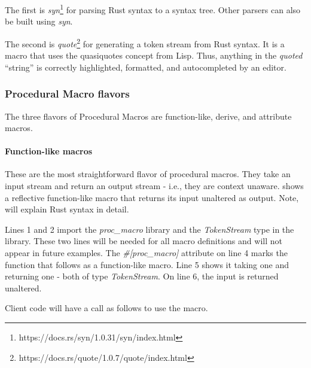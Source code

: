 The first is \textit{syn}\footnote{https://docs.rs/syn/1.0.31/syn/index.html} for parsing Rust syntax to a syntax tree.
Other parsers can also be built using \textit{syn}.

The second is \textit{quote}\footnote{https://docs.rs/quote/1.0.7/quote/index.html} for generating a token stream from Rust syntax.
It is a macro that uses the quasiquotes concept from Lisp.
Thus, anything in the \textit{quoted} ``string'' is correctly highlighted, formatted, and autocompleted by an editor.

\subsubsection{Procedural Macro flavors}
\label{sec:procedural-macro-flavors}

\newcommand{\functionh}[1]{\highlight[Yellow!100!]{#1}}
\newcommand{\inputh}[1]{\highlight[Blue!40!]{#1}}
\newcommand{\outputh}[1]{\highlight[Green!40!]{#1}}
\newcommand{\contexth}[1]{\highlight[Red!40!]{#1}}

The three flavors of Procedural Macros are function-like, derive, and attribute macros.

\paragraph{Function-like macros}
These are the most straightforward flavor of procedural macros.
They take an input stream and return an output stream - i.e., they are context unaware.
 shows a reflective function-like macro that returns its input unaltered as output.
Note,  will explain Rust syntax in detail.


Lines 1 and 2 import the \textit{proc\_macro} library and the \textit{TokenStream} type in the library.
These two lines will be needed for all macro definitions and will not appear in future examples.
The \textit{\#[proc\_macro]} attribute on line 4 marks the function that follows as a function-like macro.
Line 5 shows it taking one \inputh{input} and returning one \outputh{output} - both of type \textit{TokenStream}.
On line 6, the input is returned unaltered.

Client code will have a call as follows to use the macro.


